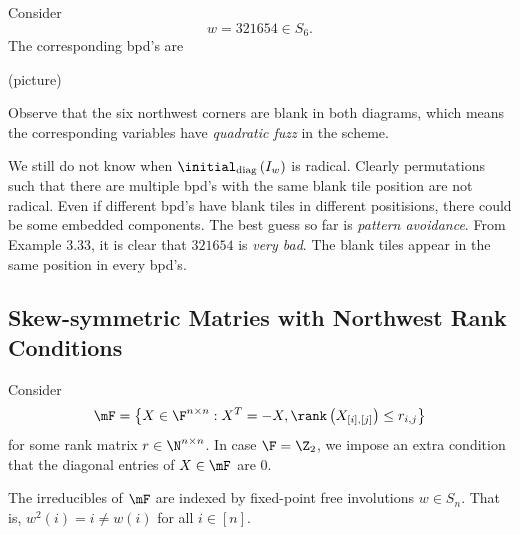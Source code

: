 \documentclass[co439]{subfiles}
\begin{document}
    \rruleline

    \clearpage
    
    \begin{example}{}
        Consider
        \begin{equation*}
            w = 321654\in S_6.
        \end{equation*}
        The corresponding bpd's are

        \begin{center}
            (picture)
        \end{center}

        Observe that the six northwest corners are blank in both diagrams, which means the corresponding variables have \textit{quadratic fuzz} in the scheme.
    \end{example}
    
    \rruleline
    
    \np We still do not know when $\initial_{\text{diag}}\left( I_w \right)$ is radical. Clearly permutations such that there are multiple bpd's with the same blank tile position are not radical. Even if different bpd's have blank tiles in different positisions, there could be some embedded components. The best guess so far is \textit{pattern avoidance}. From Example 3.33, it is clear that $321654$ is \textit{very bad}. The blank tiles appear in the same position in every bpd's.

    \subsection{Skew-symmetric Matries with Northwest Rank Conditions}

    Consider
    \begin{equation*}
        \mF = \left\lbrace X\in\F^{n\times n}: X^{T} = -X, \rank\left( X_{\left[ i \right],\left[ j \right]} \right) \leq r_{i,j} \right\rbrace
    \end{equation*}
    for some rank matrix $r\in\N^{n\times n}$. In case $\F = \Z_2$, we impose an extra condition that the diagonal entries of $X\in\mF$ are $0$.

    \np The irreducibles of $\mF$ are indexed by fixed-point free involutions $w\in S_n$. That is, $w^{2}\left( i \right) = i \neq w\left( i \right)$ for all $i\in\left[ n \right]$.
\end{document}

